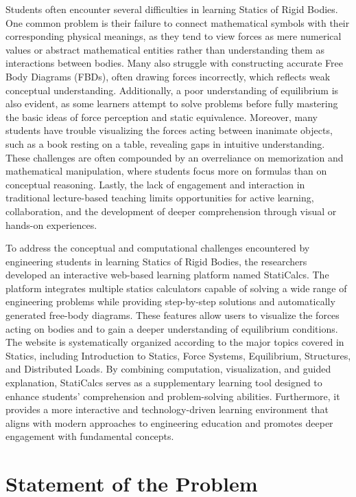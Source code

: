 Students often encounter several difficulties in learning Statics of Rigid Bodies. One common problem is their failure to connect mathematical symbols with their corresponding physical meanings, as they tend to view forces as mere numerical values or abstract mathematical entities rather than understanding them as interactions between bodies. Many also struggle with constructing accurate Free Body Diagrams (FBDs), often drawing forces incorrectly, which reflects weak conceptual understanding. Additionally, a poor understanding of equilibrium is also evident, as some learners attempt to solve problems before fully mastering the basic ideas of force perception and static equivalence. Moreover, many students have trouble visualizing the forces acting between inanimate objects, such as a book resting on a table, revealing gaps in intuitive understanding. These challenges are often compounded by an overreliance on memorization and mathematical manipulation, where students focus more on formulas than on conceptual reasoning. Lastly, the lack of engagement and interaction in traditional lecture-based teaching limits opportunities for active learning, collaboration, and the development of deeper comprehension through visual or hands-on experiences.

To address the conceptual and computational challenges encountered by engineering students in learning Statics of Rigid Bodies, the researchers developed an interactive web-based learning platform named StatiCalcs. The platform integrates multiple statics calculators capable of solving a wide range of engineering problems while providing step-by-step solutions and automatically generated free-body diagrams. These features allow users to visualize the forces acting on bodies and to gain a deeper understanding of equilibrium conditions. The website is systematically organized according to the major topics covered in Statics, including Introduction to Statics, Force Systems, Equilibrium, Structures, and Distributed Loads. By combining computation, visualization, and guided explanation, StatiCalcs serves as a supplementary learning tool designed to enhance students’ comprehension and problem-solving abilities. Furthermore, it provides a more interactive and technology-driven learning environment that aligns with modern approaches to engineering education and promotes deeper engagement with fundamental concepts.

\section{Statement of the Problem}\label{sec:1-sop}

